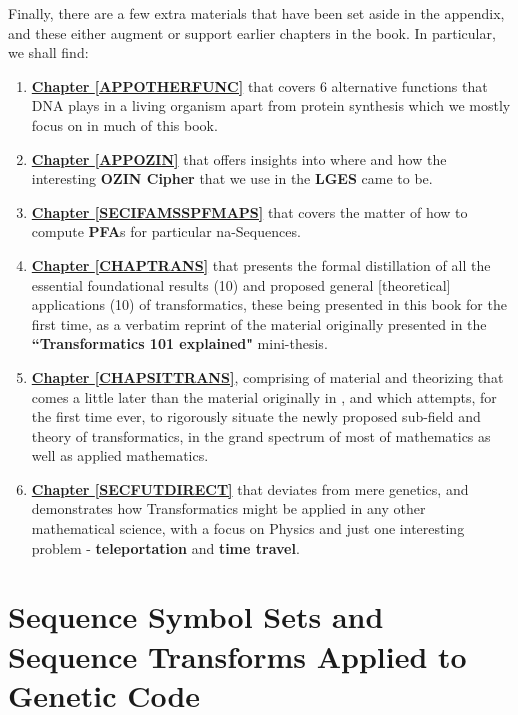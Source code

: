 \documentclass[a4paper, 18pt]{book} %
\begin{document}
Finally, there are a few extra materials that have been set aside in the appendix, and these either augment or support earlier chapters in the book. In particular, we shall find:

\begin{enumerate}
\item \textbf{\hyperref[APPOTHERFUNC]{Chapter \ref{APPOTHERFUNC}}} that covers 6 alternative functions that DNA plays in a living organism apart from protein synthesis which we mostly focus on in much of this book.

\item \textbf{\hyperref[APPOZIN]{Chapter \ref{APPOZIN}}} that offers insights into where and how the interesting \textbf{OZIN Cipher} that we use in the \textbf{LGES} came to be.

\item \textbf{\hyperref[SECIFAMSSPFMAPS]{Chapter \ref{SECIFAMSSPFMAPS}}} that covers the matter of how to compute \textbf{PFA}s for particular na-Sequences.

\item \textbf{\hyperref[CHAPTRANS]{Chapter \ref{CHAPTRANS}}} that presents the formal distillation of all the essential foundational results (10)  and proposed general [theoretical] applications (10) of transformatics, these being presented in this book for the first time, as a verbatim reprint of the material originally presented in the \textbf{``Transformatics 101 explained"} mini-thesis\cite{Lutalo2025_transformatics_thesis}.

\item \textbf{\hyperref[CHAPSITTRANS]{Chapter \ref{CHAPSITTRANS}}}, comprising of material and theorizing that comes a little later than the material originally in \cite{Lutalo2025_transformatics_thesis}, and which attempts, for the first time ever, to rigorously situate the newly proposed sub-field and theory of transformatics, in the grand spectrum of most of mathematics as well as applied mathematics.

\item \textbf{\hyperref[SECFUTDIRECT]{Chapter \ref{SECFUTDIRECT}}} that deviates from mere genetics, and demonstrates how Transformatics might be applied in any other mathematical science, with a focus on Physics and just one interesting problem - \textbf{teleportation} and \textbf{time travel}.

\end{enumerate}




\chapter{Sequence Symbol Sets and Sequence Transforms Applied to Genetic Code}
\label{SEC2}
\end{document}
